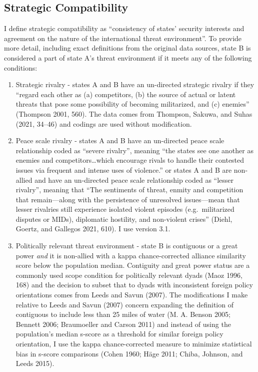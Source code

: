 \documentclass[
  letterpaper,
  DIV=11,
  numbers=noendperiod]{scrartcl}
\begin{document}
\subsection{Strategic Compatibility}\label{strategic-compatibility}

I define strategic compatibility as ``consistency of states' security
interests and agreement on the nature of the international threat
environment''. To provide more detail, including exact definitions from
the original data sources, state B is considered a part of state A's
threat environment if it meets any of the following conditions:

\begin{enumerate}
\def\labelenumi{\arabic{enumi})}
\item
  Strategic rivalry - states A and B have an un-directed strategic
  rivalry if they ``regard each other as (a) competitors, (b) the source
  of actual or latent threats that pose some possibility of becoming
  militarized, and (c) enemies'' (Thompson 2001, 560). The data comes
  from Thompson, Sakuwa, and Suhas (2021, 34--46) and codings are used
  without modification.
\item
  Peace scale rivalry - states A and B have an un-directed peace scale
  relationship coded as ``severe rivalry'', meaning ``the states see one
  another as enemies and competitors\ldots which encourage rivals to
  handle their contested issues via frequent and intense uses of
  violence.'' or states A and B are non-allied and have an un-directed
  peace scale relationship coded as ``lesser rivalry'', meaning that
  ``The sentiments of threat, enmity and competition that remain---along
  with the persistence of unresolved issues---mean that lesser rivalries
  still experience isolated violent episodes (e.g.~militarized disputes
  or MIDs), diplomatic hostility, and non-violent crises'' (Diehl,
  Goertz, and Gallegos 2021, 610). I use version 3.1.
\item
  Politically relevant threat environment - state B is contiguous or a
  great power \emph{and} it is non-allied with a kappa chance-corrected
  alliance similarity score below the population median. Contiguity and
  great power status are a commonly used scope condition for politically
  relevant dyads (Maoz 1996, 168) and the decision to subset that to
  dyads with inconsistent foreign policy orientations comes from Leeds
  and Savun (2007). The modifications I make relative to Leeds and Savun
  (2007) concern expanding the definition of contiguous to include less
  than 25 miles of water (M. A. Benson 2005; Bennett 2006; Braumoeller
  and Carson 2011) and instead of using the population's median s-score
  as a threshold for similar foreign policy orientation, I use the kappa
  chance-corrected measure to minimize statistical bias in s-score
  comparisons (Cohen 1960; Häge 2011; Chiba, Johnson, and Leeds 2015).
\end{enumerate}
\end{document}
